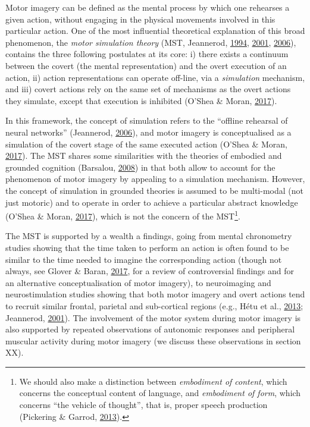 \documentclass[a4paper,12pt,twoside,openright,oldfontcommands]{memoir}
\let\rmarkdownfootnote\footnote%
\def\footnote{\protect\rmarkdownfootnote}
\begin{document}
Motor imagery can be defined as the mental process by which one rehearses a given action, without engaging in the physical movements involved in this particular action. One of the most influential theoretical explanation of this broad phenomenon, the \emph{motor simulation theory} (MST, Jeannerod, \protect\hyperlink{ref-jeannerod_representing_1994}{1994}, \protect\hyperlink{ref-jeannerod_neural_2001}{2001}, \protect\hyperlink{ref-jeannerod_motor_2006}{2006}), contains the three following postulates at its core: i) there exists a continuum between the covert (the mental representation) and the overt execution of an action, ii) action representations can operate off-line, via a \emph{simulation} mechanism, and iii) covert actions rely on the same set of mechanisms as the overt actions they simulate, except that execution is inhibited (O'Shea \& Moran, \protect\hyperlink{ref-oshea_does_2017}{2017}).

In this framework, the concept of simulation refers to the \enquote{offline rehearsal of neural networks} (Jeannerod, \protect\hyperlink{ref-jeannerod_motor_2006}{2006}), and motor imagery is conceptualised as a simulation of the covert stage of the same executed action (O'Shea \& Moran, \protect\hyperlink{ref-oshea_does_2017}{2017}). The MST shares some similarities with the theories of embodied and grounded cognition (Barsalou, \protect\hyperlink{ref-Barsalou2008}{2008}) in that both allow to account for the phenomenon of motor imagery by appealing to a simulation mechanism. However, the concept of simulation in grounded theories is assumed to be multi-modal (not just motoric) and to operate in order to achieve a particular abstract knowledge (O'Shea \& Moran, \protect\hyperlink{ref-oshea_does_2017}{2017}), which is not the concern of the MST\footnote{We should also make a distinction between \emph{embodiment of content}, which concerns the conceptual content of language, and \emph{embodiment of form}, which concerns \enquote{the vehicle of thought}, that is, proper speech production (Pickering \& Garrod, \protect\hyperlink{ref-pickering_integrated_2013}{2013}).}.

The MST is supported by a wealth a findings, going from mental chronometry studies showing that the time taken to perform an action is often found to be similar to the time needed to imagine the corresponding action (though not always, see Glover \& Baran, \protect\hyperlink{ref-glover_motor-cognitive_2017}{2017}, for a review of controversial findings and for an alternative conceptualisation of motor imagery), to neuroimaging and neurostimulation studies showing that both motor imagery and overt actions tend to recruit similar frontal, parietal and sub-cortical regions (e.g., Hétu et al., \protect\hyperlink{ref-hetu_neural_2013}{2013}; Jeannerod, \protect\hyperlink{ref-jeannerod_neural_2001}{2001}). The involvement of the motor system during motor imagery is also supported by repeated observations of autonomic responses and peripheral muscular activity during motor imagery (we discuss these observations in section XX).
\end{document}
